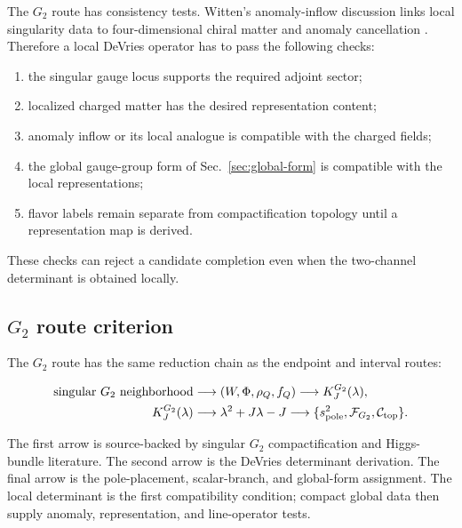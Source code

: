The \(G_2\) route has consistency tests.  Witten's anomaly-inflow discussion
links local singularity data to four-dimensional chiral matter and anomaly
cancellation \cite{WittenG2Anomaly2001}.  Therefore a local DeVries operator
has to pass the following checks:
\begin{enumerate}
\item the singular gauge locus supports the required adjoint sector;
\item localized charged matter has the desired representation content;
\item anomaly inflow or its local analogue is compatible with the charged fields;
\item the global gauge-group form of Sec.~\ref{sec:global-form} is compatible with the local representations;
\item flavor labels remain separate from compactification topology until a representation map is derived.
\end{enumerate}
These checks can reject a candidate completion even when the two-channel determinant is obtained locally.

\subsection{\texorpdfstring{$G_2$}{G2} route criterion}
\label{sec:g2-completion-criterion}

The \(G_2\) route has the same reduction chain as the endpoint and interval routes:
\begin{widetext}
\begin{equation}
\begin{aligned}
  \text{singular }G_2\text{ neighborhood}
  &\longrightarrow
  (W,\Phi,\rho_Q,f_Q)
  \longrightarrow
  K_J^{G_2}(\lambda),
  \\
  K_J^{G_2}(\lambda)
  &\longrightarrow
  \lambda^2+J\lambda-J
  \longrightarrow
  \{s^2_{\rm pole},\mathcal F_{G_2},\mathcal C_{\rm top}\}.
\end{aligned}
\label{eq:g2-completion-chain}
\end{equation}
\end{widetext}
The first arrow is source-backed by singular \(G_2\) compactification and Higgs-bundle literature.  The second arrow is the DeVries determinant derivation.  The final arrow is the pole-placement, scalar-branch, and global-form assignment.  The local determinant is the first compatibility condition; compact global data then supply anomaly, representation, and line-operator tests.
